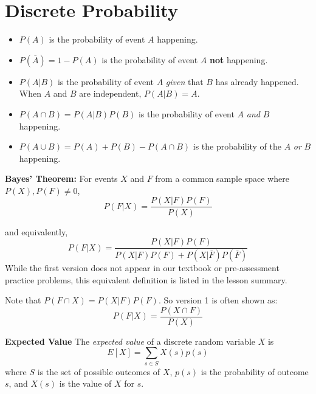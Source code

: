 \documentclass{exam}
\begin{document}
\section*{Discrete Probability}  
    \begin{itemize}
        \item $P(A)$ is the probability of event $A$ happening.
        \item $P(\overline{A})=1-P(A)$ is the probability of event $A$ \textbf{not }happening. 
        \item $P(A|B)$ is the probability of event $A$ \textit{given} that $B$ has already happened. When $A$ and $B$ are independent, $P(A|B)=A$.
        \item $P(A\cap B)=P(A|B)P(B)$ is the probability of event $A$ \textit{and} $B$ happening.  
        \item $P(A\cup B)=P(A)+P(B)-P(A\cap B)$ is the probability of the $A$ \textit{or} $B$ happening.
    \end{itemize}
\begin{myThm}
\textbf{Bayes' Theorem:} For events $X$ and $F$ from a common sample space where $P(X),P(F)\neq 0$, 
    \begin{equation}\label{eqn: bayes1}
        P(F|X)=\frac{P(X|F)P(F)}{P(X)}\tag{version 1}
    \end{equation}

    and equivalently,
    \begin{equation}\label{eqn: bayes2}
        P(F|X)=\displaystyle \frac{P(X|F)P(F)}{P(X|F)P(F)+P(X|\overline{F})P(\overline{F})}\tag{version 2}
    \end{equation}
    While the first version does not appear in our textbook or pre-assessment practice problems, this equivalent definition is listed in the lesson summary. 
    
    Note that $P(F\cap X)=P(X|F)P(F)$. So version 1 is often shown as:
    \begin{equation}\label{eqn: bayes3}
        P(F|X)=\frac{P(X\cap F)}{P(X)}\tag{version 3}
    \end{equation}
\end{myThm}
\vspace{10pt}

\begin{myThm}
    \textbf{Expected Value} The \emph{expected value} of a discrete random variable $X$ is $$E[X]=\sum_{s\in S}X(s)p(s)$$ where $S$ is the set of possible outcomes of $X$, $p(s)$ is the probability of outcome $s$, and $X(s)$ is the value of $X$ for $s$.
\end{myThm}
\end{document}
